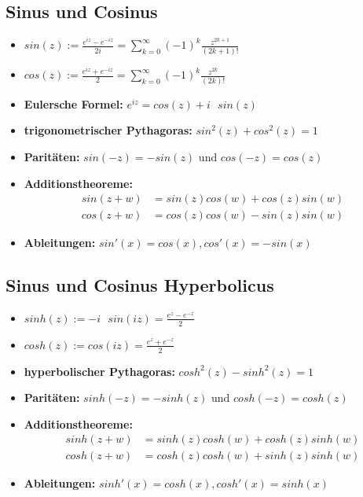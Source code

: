 \documentclass[german]{latex4ei/latex4ei_sheet}
\begin{document}
\begin{sectionbox}
	\subsection{Sinus und Cosinus}
	\begin{itemize}

	\item $sin(z):=\frac{e^{iz}-e^{-iz}}{2i}=\sum\limits_{k=0}^{\infty}(-1)^k \frac{z^{2k+1}}{(2k+1)!}$
\item	$cos(z):=\frac{e^{iz}+e^{-iz}}{2}=\sum\limits_{k=0}^{\infty}(-1)^k \frac{z^{2k}}{(2k)!}$

	\item \textbf{Eulersche Formel: }$e^{iz}=cos(z)+i \text{ }sin(z)$
	\item \textbf{trigonometrischer Pythagoras: }$sin^2(z)+cos^2(z)=1$
	\item \textbf{Paritäten: } $sin(-z)=-sin(z) \text{ und } cos(-z)=cos(z)$
	\item \textbf{Additionstheoreme:} \begin{align*}
		sin(z+w) &= sin(z)cos(w)+cos(z)sin(w)\\
		cos(z+w) &= cos(z)cos(w)-sin(z)sin(w)
		\end{align*}
\item \textbf{Ableitungen: } $sin'(x)=cos(x), cos'(x)=-sin(x)$


	\end{itemize}





\end{sectionbox}

\begin{sectionbox}
	\subsection{Sinus und Cosinus Hyperbolicus}
	\begin{itemize}
		\item $sinh(z):=-i \text{  } sin(iz)=\frac{e^z-e^{-z}}{2}$
		\item $cosh(z):=cos(iz)=\frac{e^z+e^{-z}}{2}$
	    \item \textbf{hyperbolischer Pythagoras: }$cosh^2(z)-sinh^2(z)=1$
	    \item \textbf{Paritäten: } $sinh(-z)=-sinh(z) \text{ und } cosh(-z)=cosh(z)$
     	\item \textbf{Additionstheoreme:} \begin{align*}
		sinh(z+w) &= sinh(z)cosh(w)+cosh(z)sinh(w)\\
		cosh(z+w) &= cosh(z)cosh(w)+sinh(z)sinh(w)
		\end{align*}
		\item \textbf{Ableitungen: } $sinh'(x)= cosh(x), cosh'(x) = sinh(x)$

	\end{itemize}

\end{sectionbox}
\end{document}
